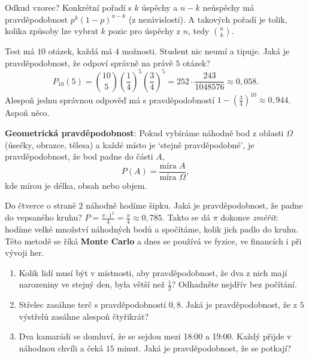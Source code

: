 Odkud vzorec? Konkrétní pořadí s $k$ úspěchy a $n - k$ neúspěchy má pravděpodobnost $p^k{(1 - p)}^{n-k}$ (z nezávislosti). A takových pořadí je tolik, kolika způsoby lze vybrat $k$ pozic pro úspěchy z $n$, tedy $\binom{n}{k}$.

\begin{example}
  Test má $10$ otázek, každá má $4$ možnosti. Student nic neumí a tipuje. Jaká je pravděpodobnost, že odpoví správně na právě $5$ otázek?
  \begin{equation*}
    P_{10}(5) = \binom{10}{5}{\left(\frac{1}{4}\right)}^5{\left(\frac{3}{4}\right)}^5 = 252\cdot\frac{243}{1048576}\approx 0{,}058.
  \end{equation*}
  Alespoň jednu správnou odpověď má s pravděpodobností $1 - {\left(\frac{3}{4}\right)}^{10}\approx 0{,}944$. Aspoň něco.
\end{example}

\begin{definitionbox}
  \textbf{Geometrická pravděpodobnost}: Pokud vybíráme náhodně bod z oblasti $\Omega$ (úsečky, obrazce, tělesa) a každé místo je `stejně pravděpodobné', je pravděpodobnost, že bod padne do části $A$,
  \begin{equation*}
    P(A) = \frac{\text{míra } A}{\text{míra } \Omega},
  \end{equation*}
  kde mírou je délka, obsah nebo objem.
\end{definitionbox}

\begin{example}
  Do čtverce o straně $2$ náhodně hodíme šipku. Jaká je pravděpodobnost, že padne do vepsaného kruhu? $P = \frac{\pi\cdot 1^2}{4} = \frac{\pi}{4}\approx 0{,}785$. Takto se dá $\pi$ dokonce \textit{změřit}: hodíme velké množství náhodných bodů a spočítáme, kolik jich padlo do kruhu. Této metodě se říká \textbf{Monte Carlo} a dnes se používá ve fyzice, ve financích i při vývoji her.
\end{example}

\begin{problem}\label{pr:narozeniny}
  \begin{enumerate}[label=(\alph*)]
    \item Kolik lidí musí být v místnosti, aby pravděpodobnost, že dva z nich mají narozeniny ve stejný den, byla větší než $\frac{1}{2}$? Odhadněte nejdřív bez počítání.
    \item Střelec zasáhne terč s pravděpodobností $0{,}8$. Jaká je pravděpodobnost, že z $5$ výstřelů zasáhne alespoň čtyřikrát?
    \item Dva kamarádi se domluví, že se sejdou mezi 18:00 a 19:00. Každý přijde v náhodnou chvíli a čeká $15$ minut. Jaká je pravděpodobnost, že se potkají?
  \end{enumerate}
\end{problem}

